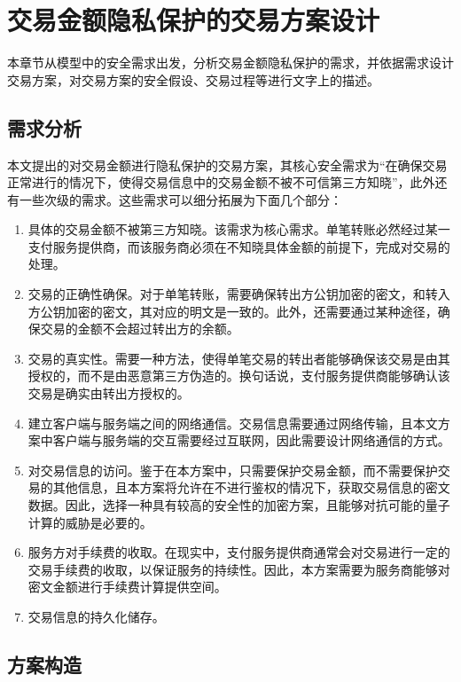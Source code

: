 \chapter{交易金额隐私保护的交易方案设计}

本章节从模型中的安全需求出发，分析交易金额隐私保护的需求，并依据需求设计交易方案，对交易方案的安全假设、交易过程等进行文字上的描述。

\section{需求分析}

本文提出的对交易金额进行隐私保护的交易方案，其核心安全需求为“在确保交易正常进行的情况下，使得交易信息中的交易金额不被不可信第三方知晓”，此外还有一些次级的需求。这些需求可以细分拓展为下面几个部分：

\begin{enumerate}
    \item 具体的交易金额不被第三方知晓。该需求为核心需求。单笔转账必然经过某一支付服务提供商，而该服务商必须在不知晓具体金额的前提下，完成对交易的处理。
    \item 交易的正确性确保。对于单笔转账，需要确保转出方公钥加密的密文，和转入方公钥加密的密文，其对应的明文是一致的。此外，还需要通过某种途径，确保交易的金额不会超过转出方的余额。
    \item 交易的真实性。需要一种方法，使得单笔交易的转出者能够确保该交易是由其授权的，而不是由恶意第三方伪造的。换句话说，支付服务提供商能够确认该交易是确实由转出方授权的。
    \item 建立客户端与服务端之间的网络通信。交易信息需要通过网络传输，且本文方案中客户端与服务端的交互需要经过互联网，因此需要设计网络通信的方式。
    \item 对交易信息的访问。鉴于在本方案中，只需要保护交易金额，而不需要保护交易的其他信息，且本方案将允许在不进行鉴权的情况下，获取交易信息的密文数据。因此，选择一种具有较高的安全性的加密方案，且能够对抗可能的量子计算的威胁是必要的。
    \item 服务方对手续费的收取。在现实中，支付服务提供商通常会对交易进行一定的交易手续费的收取，以保证服务的持续性。因此，本方案需要为服务商能够对密文金额进行手续费计算提供空间。
    \item 交易信息的持久化储存。
\end{enumerate}

\section{方案构造}


